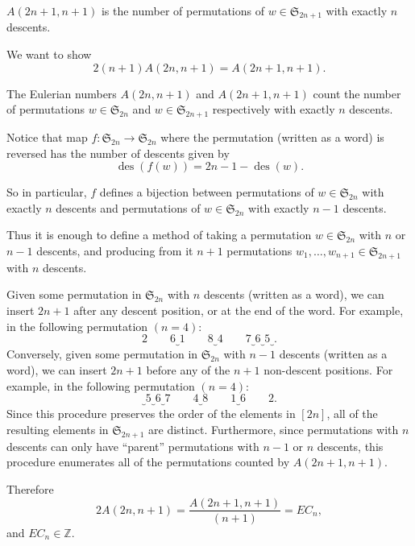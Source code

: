 \documentclass{article}
\newenvironment{solution}[1][Solution.]{\begin{trivlist}
\item[\hskip \labelsep {\bfseries #1}]}{\end{trivlist}}
\begin{document}
\begin{solution} \text{} \\
  $A(2n + 1, n + 1)$ is the number of permutations of
  $w \in \mathfrak S_{2n + 1}$ with exactly $n$ descents.

  We want to show \[
    2(n + 1)A(2n, n + 1) = A(2n + 1, n + 1).
  \]

  The Eulerian numbers $A(2n, n + 1)$ and $A(2n + 1, n + 1)$ count the number of
  permutations $w \in \mathfrak S_{2n}$ and $w \in \mathfrak S_{2n + 1}$
  respectively with exactly $n$ descents.

  Notice that map
  $f\colon \mathfrak S_{2n} \rightarrow \mathfrak S_{2n}$ where the permutation
  (written as a word) is reversed has the number of descents given by \[
    \operatorname{des}(f(w)) = 2n - 1 - \operatorname{des}(w).
  \]

  So in particular, $f$ defines a bijection between
  permutations of $w \in \mathfrak S_{2n}$ with exactly $n$ descents and
  permutations of $w \in \mathfrak S_{2n}$ with exactly $n - 1$ descents.

  Thus it is enough to define a method of taking a permutation
  $w \in \mathfrak S_{2n}$ with $n$ or $n - 1$ descents, and producing from
  it $n + 1$ permutations $w_1, \hdots, w_{n + 1} \in \mathfrak S_{2n + 1}$
  with $n$ descents.

  Given some permutation in $\mathfrak S_{2n}$ with $n$ descents
  (written as a word), we can insert $2n + 1$ after any descent position, or at
  the end of the word. For example, in the following permutation $(n = 4)$:
  \[
    2\quad\quad6\underbrace{}1\quad\quad8\underbrace{}4\quad\quad7\underbrace{}6\underbrace{}5\underbrace{}.
  \]
  Conversely, given some permutation in $\mathfrak S_{2n}$ with $n - 1$ descents
  (written as a word), we can insert $2n + 1$ before any of the $n + 1$
  non-descent positions.
  For example, in the following permutation $(n = 4)$:
  \[
    \underbrace{}5\underbrace{}6\underbrace{}7\quad\quad4\underbrace{}8\quad\quad1\underbrace{}6\quad\quad2.
  \]
  Since this procedure preserves the order of the elements in $[2n]$, all of the
  resulting elements in $\mathfrak S_{2n + 1}$ are distinct. Furthermore,
  since permutations with $n$ descents can only have ``parent'' permutations
  with $n-1$ or $n$ descents, this procedure enumerates all of the permutations
  counted by $A(2n + 1, n + 1)$.

  Therefore \[
    2A(2n, n + 1) = \frac{A(2n + 1, n + 1)}{(n + 1)} = EC_n,
  \]
  and $EC_n \in \mathbb Z$.
\end{solution}
\end{document}
